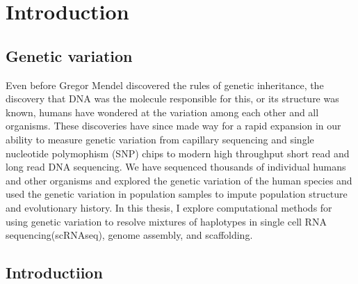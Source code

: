 
\chapter{Introduction}

\ifpdf
    \graphicspath{{Chapter1/Figs/Raster/}{Chapter1/Figs/PDF/}{Chapter1/Figs/}}
\else
    \graphicspath{{Chapter1/Figs/Vector/}{Chapter1/Figs/}}
\fi

\section{Genetic variation}

\par{
Even before Gregor Mendel discovered the rules of genetic inheritance\cite{mendel}, the discovery that DNA was the molecule responsible for this\cite{Avery}, or its structure was known\cite{watsoncrick}, humans have wondered at the variation among each other and all organisms. These discoveries have since made way for a rapid expansion in our ability to measure genetic variation from capillary sequencing\cite{capillary} and single nucleotide polymophism (SNP) chips\cite{snpchip} to modern high throughput short read\cite{bridgeamp} and long read DNA sequencing\cite{HIFI}. We have sequenced thousands of individual humans and other organisms and explored the genetic variation of the human species \cite{1kgenomes}\cite{1kgenomes2}\cite{haplotypepanel}\cite{ukbiobank}\cite{hapmap} and used the genetic variation in population samples to impute population structure and evolutionary history\cite{NGSadmix}\cite{angsd}\cite{estimateadmixture}\cite{abbababa}\cite{shapeit4}\cite{beagle}. In this thesis, I explore computational methods for using genetic variation to resolve mixtures of haplotypes in single cell RNA sequencing(scRNAseq), genome assembly, and scaffolding.
} 

\section{Introductiion}


